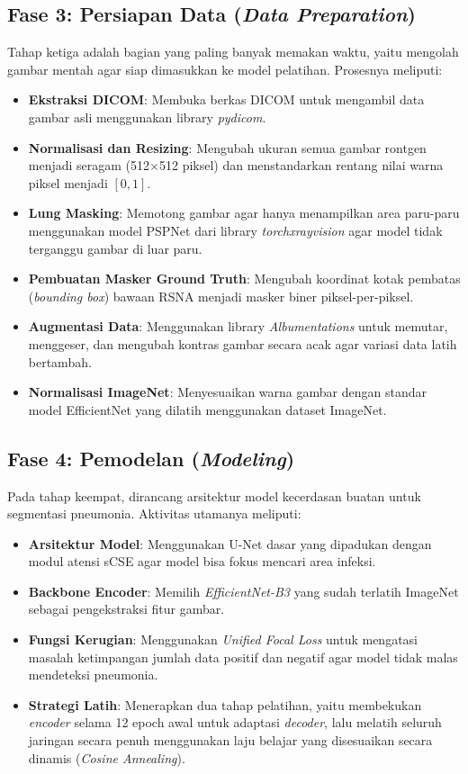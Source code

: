 \documentclass[12pt,a4paper,oneside]{book}
\begin{document}
\subsection{Fase 3: Persiapan Data (\textit{Data Preparation})}

Tahap ketiga adalah bagian yang paling banyak memakan waktu, yaitu mengolah gambar mentah agar siap dimasukkan ke model pelatihan. Prosesnya meliputi:
\begin{itemize}
  \item \textbf{Ekstraksi DICOM}: Membuka berkas DICOM untuk mengambil data gambar asli menggunakan library \textit{pydicom}.
  \item \textbf{Normalisasi dan Resizing}: Mengubah ukuran semua gambar rontgen menjadi seragam (512$\times$512 piksel) dan menstandarkan rentang nilai warna piksel menjadi $[0, 1]$.
  \item \textbf{Lung Masking}: Memotong gambar agar hanya menampilkan area paru-paru menggunakan model PSPNet dari library \textit{torchxrayvision} agar model tidak terganggu gambar di luar paru.
  \item \textbf{Pembuatan Masker Ground Truth}: Mengubah koordinat kotak pembatas (\textit{bounding box}) bawaan RSNA menjadi masker biner piksel-per-piksel.
  \item \textbf{Augmentasi Data}: Menggunakan library \textit{Albumentations} untuk memutar, menggeser, dan mengubah kontras gambar secara acak agar variasi data latih bertambah.
  \item \textbf{Normalisasi ImageNet}: Menyesuaikan warna gambar dengan standar model EfficientNet yang dilatih menggunakan dataset ImageNet.
\end{itemize}

\subsection{Fase 4: Pemodelan (\textit{Modeling})}

Pada tahap keempat, dirancang arsitektur model kecerdasan buatan untuk segmentasi pneumonia. Aktivitas utamanya meliputi:
\begin{itemize}
  \item \textbf{Arsitektur Model}: Menggunakan U-Net dasar yang dipadukan dengan modul atensi sCSE agar model bisa fokus mencari area infeksi.
  \item \textbf{Backbone Encoder}: Memilih \textit{EfficientNet-B3} yang sudah terlatih ImageNet sebagai pengekstraksi fitur gambar.
  \item \textbf{Fungsi Kerugian}: Menggunakan \textit{Unified Focal Loss} untuk mengatasi masalah ketimpangan jumlah data positif dan negatif agar model tidak malas mendeteksi pneumonia.
  \item \textbf{Strategi Latih}: Menerapkan dua tahap pelatihan, yaitu membekukan \textit{encoder} selama 12 epoch awal untuk adaptasi \textit{decoder}, lalu melatih seluruh jaringan secara penuh menggunakan laju belajar yang disesuaikan secara dinamis (\textit{Cosine Annealing}).
\end{itemize}
\end{document}

